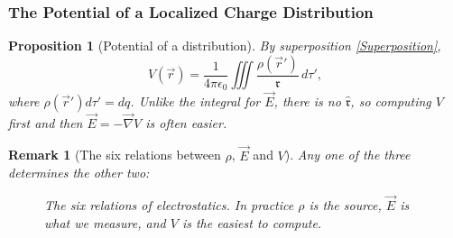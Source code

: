 \documentclass{article}
\newtheorem{remark}{Remark}
\newtheorem{proposition}{Proposition}
\begin{document}
\subsubsection{The Potential of a Localized Charge Distribution}
\begin{proposition}[Potential of a distribution]
    By superposition \eqref{Superposition},
    \begin{equation}
        \label{eq:V-distribution}
        V(\vec{r}) = \frac{1}{4\pi\epsilon_0}\iiint\frac{\rho(\vec{r}')}{\mathfrak{r}}\,d\tau',
    \end{equation}
    where $\rho(\vec{r}')d\tau'=dq$. Unlike the integral for $\vec{E}$, there is no $\hat{\mathfrak{r}}$, so computing $V$ first and then $\vec{E} = -\vec{\nabla}V$ is often easier.
\end{proposition}
\begin{remark}[The six relations between $\rho$, $\vec{E}$ and $V$]
    Any one of the three determines the other two:
    \begin{figure}[H]
        \centering
        \caption{The six relations of electrostatics. In practice $\rho$ is the source, $\vec{E}$ is what we measure, and $V$ is the easiest to compute.}
    \end{figure}
\end{remark}
\end{document}

